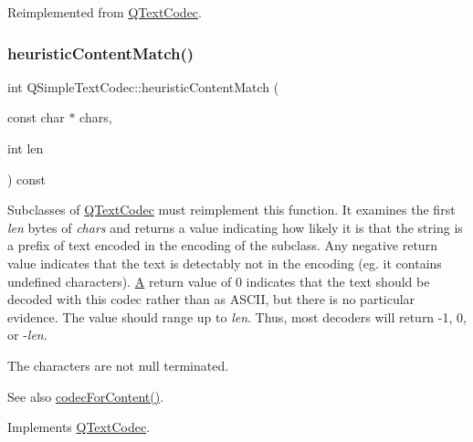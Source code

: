 Reimplemented from \mbox{\hyperlink{class_q_text_codec_a564dc8bf15241a165a38287c1d26e48c}{Q\+Text\+Codec}}.

\mbox{\label{class_q_simple_text_codec_a77599a0baeceb12a42dadcbeb9b03994}} 
\subsubsection{\texorpdfstring{heuristicContentMatch()}{heuristicContentMatch()}}
{\footnotesize\ttfamily int Q\+Simple\+Text\+Codec\+::heuristic\+Content\+Match (\begin{DoxyParamCaption}\item[{const char $\ast$}]{chars,  }\item[{int}]{len }\end{DoxyParamCaption}) const\hspace{0.3cm}{\ttfamily [virtual]}}

Subclasses of \mbox{\hyperlink{class_q_text_codec}{Q\+Text\+Codec}} must reimplement this function. It examines the first {\itshape len} bytes of {\itshape chars} and returns a value indicating how likely it is that the string is a prefix of text encoded in the encoding of the subclass. Any negative return value indicates that the text is detectably not in the encoding (eg. it contains undefined characters). \mbox{\hyperlink{class_a}{A}} return value of 0 indicates that the text should be decoded with this codec rather than as A\+S\+C\+II, but there is no particular evidence. The value should range up to {\itshape len}. Thus, most decoders will return -\/1, 0, or -\/{\itshape len}.

The characters are not null terminated.

\begin{DoxySeeAlso}{See also}
\mbox{\hyperlink{class_q_text_codec_aeb3ec365c6c4f1812689a2b66ed09e27}{codec\+For\+Content()}}. 
\end{DoxySeeAlso}


Implements \mbox{\hyperlink{class_q_text_codec_a4780a608d950994a927de727bb07b9fe}{Q\+Text\+Codec}}.

\mbox{\label{class_q_simple_text_codec_ab08ae2e5e99af1cd6dda3450731e502b}} 
